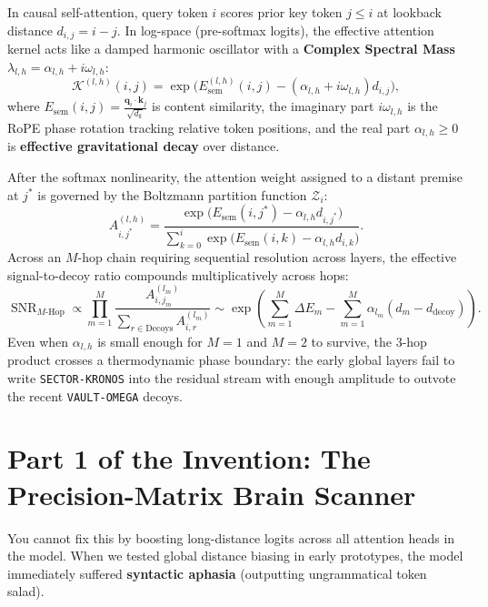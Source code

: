 \documentclass[11pt,letterpaper]{article}
\begin{document}
In causal self-attention, query token $i$ scores prior key token $j \le i$ at lookback distance $d_{i,j} = i - j$. In log-space (pre-softmax logits), the effective attention kernel acts like a damped harmonic oscillator with a \textbf{Complex Spectral Mass} $\lambda_{l,h} = \alpha_{l,h} + i\omega_{l,h}$:
\begin{equation}
\mathcal{K}^{(l,h)}(i, j) = \exp\!\Big(E_{\text{sem}}^{(l,h)}(i, j) - (\alpha_{l,h} + i\omega_{l,h}) d_{i,j}\Big),
\end{equation}
where $E_{\text{sem}}(i,j) = \frac{\mathbf{q}_i \cdot \mathbf{k}_j}{\sqrt{d_k}}$ is content similarity, the imaginary part $i\omega_{l,h}$ is the RoPE phase rotation tracking relative token positions, and the real part $\alpha_{l,h} \ge 0$ is \textbf{effective gravitational decay} over distance.

After the softmax nonlinearity, the attention weight assigned to a distant premise at $j^*$ is governed by the Boltzmann partition function $\mathcal{Z}_i$:
\begin{equation}
A^{(l,h)}_{i, j^*} = \frac{\exp\big(E_{\text{sem}}(i, j^*) - \alpha_{l,h} d_{i,j^*}\big)}{\sum_{k=0}^{i} \exp\big(E_{\text{sem}}(i, k) - \alpha_{l,h} d_{i,k}\big)}.
\end{equation}
Across an $M$-hop chain requiring sequential resolution across layers, the effective signal-to-decoy ratio compounds multiplicatively across hops:
\begin{equation}
\operatorname{SNR}_{M\text{-Hop}} \propto \prod_{m=1}^{M} \frac{A^{(l_m)}_{i, j_m}}{\sum_{r \in \text{Decoys}} A^{(l_m)}_{i, r}} \sim \exp\!\left(\sum_{m=1}^{M} \Delta E_m - \sum_{m=1}^{M} \alpha_{l_m} (d_m - d_{\text{decoy}})\right).
\end{equation}
Even when $\alpha_{l,h}$ is small enough for $M=1$ and $M=2$ to survive, the 3-hop product crosses a thermodynamic phase boundary: the early global layers fail to write \texttt{SECTOR-KRONOS} into the residual stream with enough amplitude to outvote the recent \texttt{VAULT-OMEGA} decoys.

\section{Part 1 of the Invention: The Precision-Matrix Brain Scanner}

You cannot fix this by boosting long-distance logits across all attention heads in the model. When we tested global distance biasing in early prototypes, the model immediately suffered \textbf{syntactic aphasia} (outputting ungrammatical token salad).
\end{document}
